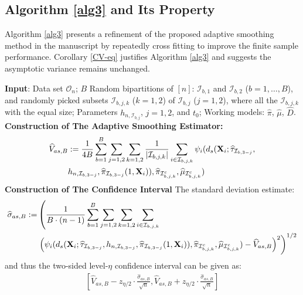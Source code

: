 \documentclass[11pt]{article}
\theoremstyle{referenceplain}
\theoremstyle{referencedefinition}
\theoremstyle{referenceremark}
\begin{document}
\subsection{Algorithm \ref{alg3} and Its Property}
Algorithm \ref{alg3} presents a refinement of the proposed adaptive smoothing method in the manuscript by repeatedly cross fitting to improve the finite sample performance. Corollary \ref{CV-eq} justifies Algorithm \ref{alg3} and suggests the asymptotic variance remains unchanged.
\setcounter{algorithm}{2}
\begin{algorithm}
\caption{Finite Sample Refinement: Repeatedly Cross Fitting and  Averaging}
    \begin{algorithmic}[1]
        \State \textbf{Input}: Data set $\mathcal{O}_n$; 
$B$ Random bipartitions of $[n]$: $\mathcal{I}_{b,1}$ and $\mathcal{I}_{b,2}$ ($b=1,\dots,B$), and randomly picked subsets $\mathcal{I}_{b,j,k}$ ($k=1,2$) of $\mathcal{I}_{b,j}$ ($j=1,2$), where all the $\mathcal{I}_{b,j,k}$ with the equal size; Parameters $h_{n,\mathcal{I}_{b,j}}$, $j=1,2$, and $t_0$; Working models: $\widehat{\pi}$, $\widehat{\mu}$, $\widehat{D}$.
        \State \textbf{Construction of 
 The Adaptive Smoothing Estimator:} 
 \begin{align}
     \widehat{V}_{as,B}&:= \frac{1}{4B}\sum_{b=1}^B \sum_{j=1,2}\sum_{k=1,2}\frac{1}{|\mathcal{I}_{b,j,k}|}\sum_{i\in\mathcal{I}_{b,j,k}}\psi_i(d_{s}(\mathbf{X}_i;\widehat{\tau}_{\mathcal{I}_{b,3-j}},\notag\\&h_{n,\mathcal{I}_{b,3-j}},\widehat{\pi}_{\mathcal{I}_{b,3-j}}(1,\mathbf{X}_i)),\widehat{\pi}_{\mathcal{I}_{b,j,k}^c},\widehat{\mu}_{\mathcal{I}_{b,j,k}^c})\label{sin-opt-est-cv}
 \end{align}
 \State \textbf{Construction of The Confidence Interval} The standard deviation estimate:
 \begin{align}
     \widehat{\sigma}_{as,B}:=&\left(\frac{1}{B\cdot(n-1)}\sum_{b=1}^B\sum_{j=1,2}\sum_{k=1,2}\sum_{i\in\mathcal{I}_{b,j,k}}\right.\notag\\
    & \left.\left(\psi_i(d_{s}(\mathbf{X}_i;\widehat{\tau}_{\mathcal{I}_{b,3-j}},h_{n,\mathcal{I}_{b,3-j}},\widehat{\pi}_{\mathcal{I}_{b,3-j}}(1,\mathbf{X}_i)),\widehat{\pi}_{\mathcal{I}_{b,j,k}^c},\widehat{\mu}_{\mathcal{I}_{b,j,k}^c})-\widehat{V}_{as,B}\right)^2\right)^{1/2}\label{sin-opt-std-cv}
 \end{align}
 and thus the two-sided level-{$\eta$} confidence interval can be given as:
\begin{align}\label{sin-CI-opt-cv}
     \left[\widehat{V}_{as,B}-{z_{\eta/2}}\cdot\frac{\widehat{\sigma}_{as,B}}{\sqrt{n}},\widehat{V}_{as,B}+{z_{\eta/2}}\cdot\frac{\widehat{\sigma}_{as,B}}{\sqrt{n}}\right]
 \end{align}
    \end{algorithmic}
    \label{alg3}
\end{algorithm}
\end{document}
